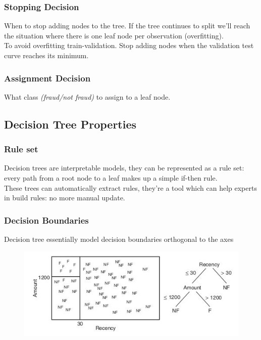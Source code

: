         \subsubsection{Stopping Decision}
            When to stop adding nodes to the tree. If the tree continues to split we'll reach the situation where there is one leaf node per observation (overfitting).\\
            To avoid overfitting train-validation. Stop adding nodes when the validation test curve reaches its minimum.
        \subsubsection{Assignment Decision}
            What class \textit{(fraud/not fraud)} to assign to a leaf node.
    \subsection{Decision Tree Properties}
            \subsubsection{Rule set}
                Decision trees are interpretable models, they can be represented as a rule set: every path from a root node to a leaf makes up a simple if-then rule.\\
                These trees can automatically extract rules, they're a tool which can help experts in build rules: no more manual update.
            \subsubsection{Decision Boundaries}
                Decision tree essentially model decision boundaries orthogonal to the axes
                \begin{figure}[ht!]
                    \centering 
                    \includegraphics[width=0.6\linewidth]{lecture_15/boundaries.png}
                \end{figure}
